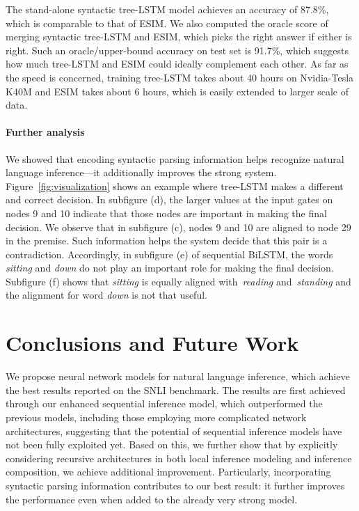 \documentclass[11pt,a4paper]{article}
\begin{document}
The stand-alone syntactic tree-LSTM model achieves an accuracy of 87.8\%, which is comparable to that of ESIM. We also computed the oracle score of merging syntactic tree-LSTM and ESIM, which picks the right answer if either is right. Such an oracle/upper-bound accuracy on test set is 91.7\%, which suggests how much tree-LSTM and ESIM could ideally complement each other. As far as the speed is concerned, training tree-LSTM takes about 40 hours on Nvidia-Tesla K40M and ESIM takes about 6 hours, which is easily extended to larger scale of data.

\paragraph{Further analysis}
We showed that encoding syntactic parsing information helps recognize natural language inference---it additionally improves the strong system. Figure~\ref{fig:visualization} shows an example where tree-LSTM makes a different and correct decision. In subfigure (d), the larger values at the input gates on nodes 9 and 10 indicate that those nodes are important in making the final decision. We observe that in subfigure (c), nodes 9 and 10 are aligned to node 29 in the premise. Such information helps the system decide that this pair is a contradiction. Accordingly, in subfigure (e) of sequential BiLSTM, the words \textit{sitting} and \textit{down} do not play an important role for making the final decision. Subfigure (f) shows that \textit{sitting} is equally aligned with~\textit{reading} and~\textit{standing} and the alignment for word \textit{down} is not that useful.  

\section{Conclusions and Future Work}
We propose neural network models for natural language inference, which achieve the best results reported on the SNLI benchmark. The results are first achieved through our enhanced sequential inference model, which outperformed the previous models, including those employing more complicated network architectures, suggesting that the potential of sequential inference models have not been fully exploited yet. Based on this, we further show that by explicitly considering recursive architectures in both local inference modeling and inference composition, we achieve additional improvement. Particularly, incorporating syntactic parsing information contributes to our best result: it further improves the performance even when added to the already very strong model. 
\end{document}
